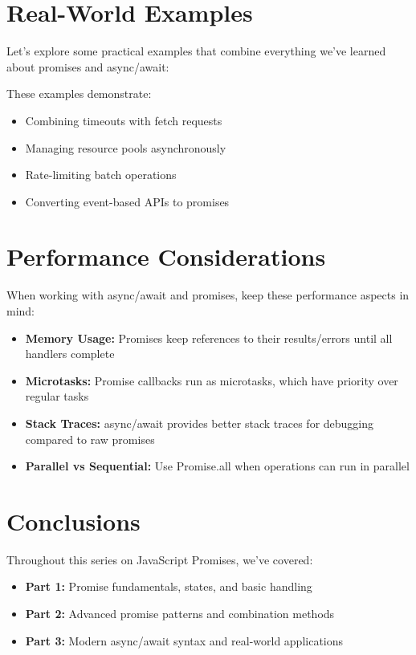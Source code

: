 \section{Real-World Examples}

Let's explore some practical examples that combine everything we've learned about promises and async/await:

\begin{macterminal}

\end{macterminal}

These examples demonstrate:
\begin{itemize}
    \item Combining timeouts with fetch requests
    \item Managing resource pools asynchronously
    \item Rate-limiting batch operations
    \item Converting event-based APIs to promises
\end{itemize}

\section{Performance Considerations}

When working with async/await and promises, keep these performance aspects in mind:

\begin{itemize}
    \item \textbf{Memory Usage:} Promises keep references to their results/errors until all handlers complete
    \item \textbf{Microtasks:} Promise callbacks run as microtasks, which have priority over regular tasks
    \item \textbf{Stack Traces:} async/await provides better stack traces for debugging compared to raw promises
    \item \textbf{Parallel vs Sequential:} Use Promise.all when operations can run in parallel
\end{itemize}

\section{Conclusions}

Throughout this series on JavaScript Promises, we've covered:

\begin{itemize}
    \item \textbf{Part 1:} Promise fundamentals, states, and basic handling
    \item \textbf{Part 2:} Advanced promise patterns and combination methods
    \item \textbf{Part 3:} Modern async/await syntax and real-world applications
\end{itemize}


